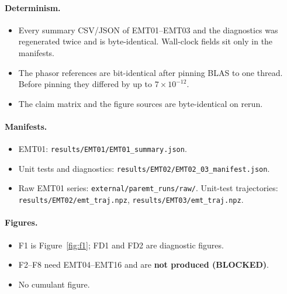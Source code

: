 \documentclass[10pt,a4paper]{article}
\newcommand{\f}[1]{\nolinkurl{#1}}
\begin{document}
\paragraph{Determinism.}
\begin{itemize}
\item Every summary CSV/JSON of EMT01--EMT03 and the diagnostics was
  regenerated twice and is byte-identical. Wall-clock fields sit only in the
  manifests.
\item The phasor references are bit-identical after pinning BLAS to one
  thread. Before pinning they differed by up to $7\times10^{-12}$.
\item The claim matrix and the figure sources are byte-identical on rerun.
\end{itemize}

\paragraph{Manifests.}
\begin{itemize}
\item EMT01: \f{results/EMT01/EMT01_summary.json}.
\item Unit tests and diagnostics: \f{results/EMT02/EMT02_03_manifest.json}.
\item Raw EMT01 series: \f{external/paremt_runs/raw/}. Unit-test trajectories:
  \f{results/EMT02/emt_traj.npz}, \f{results/EMT03/emt_traj.npz}.
\end{itemize}

\paragraph{Figures.}
\begin{itemize}
\item F1 is Figure~\ref{fig:f1}; FD1 and FD2 are diagnostic figures.
\item F2--F8 need EMT04--EMT16 and are \textbf{not produced (BLOCKED)}.
\item No cumulant figure.
\end{itemize}

\end{document}
